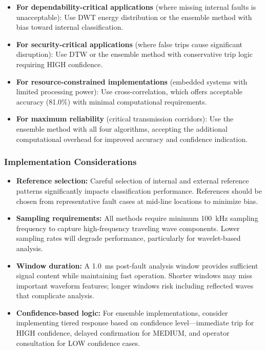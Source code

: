 \documentclass[journal]{IEEEtran}
\begin{document}
\begin{itemize}
    \item \textbf{For dependability-critical applications} (where missing internal faults is unacceptable): Use DWT energy distribution or the ensemble method with bias toward internal classification.
    
    \item \textbf{For security-critical applications} (where false trips cause significant disruption): Use DTW or the ensemble method with conservative trip logic requiring HIGH confidence.
    
    \item \textbf{For resource-constrained implementations} (embedded systems with limited processing power): Use cross-correlation, which offers acceptable accuracy (81.0\%) with minimal computational requirements.
    
    \item \textbf{For maximum reliability} (critical transmission corridors): Use the ensemble method with all four algorithms, accepting the additional computational overhead for improved accuracy and confidence indication.
\end{itemize}

\subsubsection{Implementation Considerations}

\begin{itemize}
    \item \textbf{Reference selection:} Careful selection of internal and external reference patterns significantly impacts classification performance. References should be chosen from representative fault cases at mid-line locations to minimize bias.
    
    \item \textbf{Sampling requirements:} All methods require minimum 100~kHz sampling frequency to capture high-frequency traveling wave components. Lower sampling rates will degrade performance, particularly for wavelet-based analysis.
    
    \item \textbf{Window duration:} A 1.0~ms post-fault analysis window provides sufficient signal content while maintaining fast operation. Shorter windows may miss important waveform features; longer windows risk including reflected waves that complicate analysis.
    
    \item \textbf{Confidence-based logic:} For ensemble implementations, consider implementing tiered response based on confidence level---immediate trip for HIGH confidence, delayed confirmation for MEDIUM, and operator consultation for LOW confidence cases.
\end{itemize}
\end{document}
